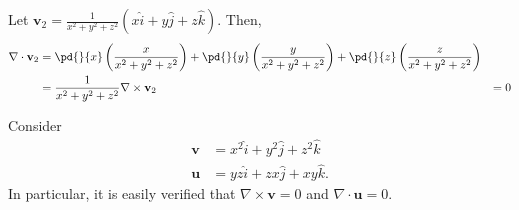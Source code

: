 \documentclass[10pt]{mypackage}
\begin{document}
\begin{example}
  Let $\mathbf{v}_2 = \frac{1}{x^2 + y^2 + z^2}\left(x\widehat{i} + y\widehat{j} + z\widehat{k}\right)$. Then,
  \begin{align*}
    \nabla \cdot \mathbf{v}_2 &= \pd{}{x}\left(\frac{x}{x^2 + y^2 + z^2}\right) + \pd{}{y}\left(\frac{y}{x^2 + y^2 + z^2}\right) + \pd{}{z}\left(\frac{z}{x^2 + y^2 + z^2}\right)\\
                              &= \frac{1}{x^2 + y^2 + z^2}
    \nabla \times \mathbf{v}_2 &= 0
  \end{align*}
\end{example}
\begin{example}
  Consider
  \begin{align*}
    \mathbf{v} &= x^2 \widehat{i} + y^2 \widehat{j} + z^2\widehat{k}\\
    \mathbf{u} &= yz\widehat{i} + zx\widehat{j} + xy\widehat{k}.
  \end{align*}
  In particular, it is easily verified that $\nabla \times \mathbf{v} = 0$ and $\nabla \cdot \mathbf{u} = 0$.
\end{example}
\end{document}
